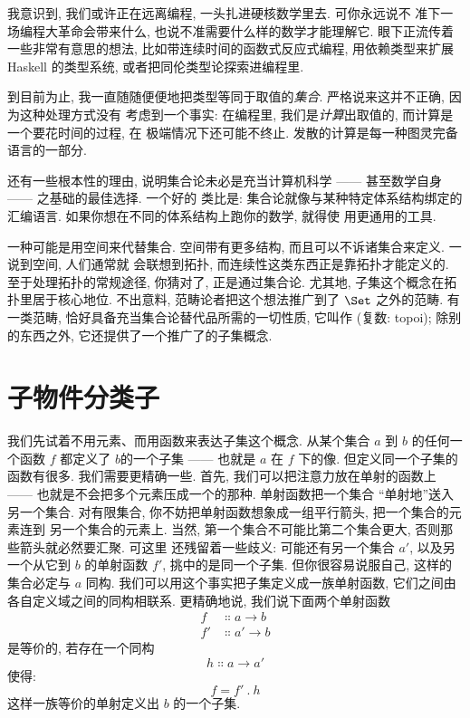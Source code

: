 
\lettrine[lhang=0.17]{我}{意识到, 我们或许正在远离编程}, 一头扎进硬核数学里去. 可你永远说不
准下一场编程大革命会带来什么, 也说不准需要什么样的数学才能理解它. 眼下正流传着一些非常有意思的想法,
比如带连续时间的函数式反应式编程, 用依赖类型来扩展 Haskell 的类型系统, 或者把同伦类型论探索进编程里.

到目前为止, 我一直随随便便地把类型等同于取值的\emph{集合}. 严格说来这并不正确, 因为这种处理方式没有
考虑到一个事实: 在编程里, 我们是\emph{计算}出取值的, 而计算是一个要花时间的过程, 在
极端情况下还可能不终止. 发散的计算是每一种图灵完备语言的一部分.

还有一些根本性的理由, 说明集合论未必是充当计算机科学 —— 甚至数学自身 —— 之基础的最佳选择. 一个好的
类比是: 集合论就像与某种特定体系结构绑定的汇编语言. 如果你想在不同的体系结构上跑你的数学, 就得使
用更通用的工具.

一种可能是用空间来代替集合. 空间带有更多结构, 而且可以不诉诸集合来定义. 一说到空间, 人们通常就
会联想到拓扑, 而连续性这类东西正是靠拓扑才能定义的. 至于处理拓扑的常规途径, 你猜对了, 正是通过集合论.
尤其地, 子集这个概念在拓扑里居于核心地位. 不出意料, 范畴论者把这个想法推广到了 $\Set$ 之外的范畴.
有一类范畴, 恰好具备充当集合论替代品所需的一切性质, 它叫作  (复数: topoi);
除别的东西之外, 它还提供了一个推广了的子集概念.

\section{子物件分类子}

我们先试着不用元素、而用函数来表达子集这个概念. 从某个集合 $a$ 到 $b$ 的任何一个函数 $f$ 都定义了
$b$的一个子集 —— 也就是 $a$ 在 $f$ 下的像. 但定义同一个子集的函数有很多. 我们需要更精确一些. 首先,
我们可以把注意力放在单射的函数上 —— 也就是不会把多个元素压成一个的那种. 单射函数把一个集合
``单射地''送入另一个集合. 对有限集合, 你不妨把单射函数想象成一组平行箭头, 把一个集合的元素连到
另一个集合的元素上. 当然, 第一个集合不可能比第二个集合更大, 否则那些箭头就必然要汇聚. 可这里
还残留着一些歧义: 可能还有另一个集合 $a'$, 以及另一个从它到 $b$ 的单射函数 $f'$, 挑中的是同一个子集.
但你很容易说服自己, 这样的集合必定与 $a$ 同构. 我们可以用这个事实把子集定义成一族单射函数,
它们之间由各自定义域之间的同构相联系. 更精确地说, 我们说下面两个单射函数
\begin{align*}
  f  & \Colon a \to b  \\
  f' & \Colon a' \to b
\end{align*}
是等价的, 若存在一个同构
\[h \Colon a \to a'\]
使得:
\[f = f'\ .\ h\]
这样一族等价的单射定义出 $b$ 的一个子集.

